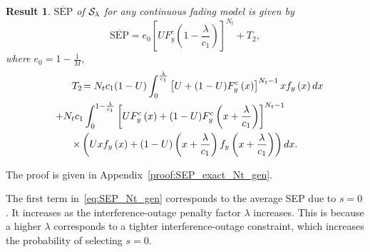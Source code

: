 \documentclass[12pt,draftcls,peerreview,onecolumn]{IEEEtran}
\newtheorem{result}{{\bf Result}}
\newcommand{\SEP}{\text{SEP}}
\newcommand{\nx}{{0}}
\newcommand{\lam}{\lambda}
\newcommand{\termtwo}{T_2}
\newcommand{\Nt}{{N_t}}
\newcommand{\Nr}{{N_r}}
\newcommand{\cone}{c_{1}}
\newcommand{\ctwo}{c_{2}}
\newcommand{\lambym}{\frac{\lam}{\cone}}
\newcommand{\al}{\ctwo}
\newcommand{\snr}{\Omega}
\newcommand{\albysnr}[1][]{\frac{\al#1}{\snr}}
\newcommand{\un}{U}
\newcommand{\zerosep}{e_0}
\newcommand{\callamrule}{{\cal S_{{\lam}}}}
\newcommand{\avgSEP}{\overline{\SEP}}
\newcommand{\unccdfy}[2]{\frac{{#1}\,\,\gamma\left(\Nr,-\albysnr\ln{#2}\right)}{\Gamma\left(\Nr\right)}}
\newcommand{\ytimespdfyNr}{\left(\ln\left(\frac{1}{x}\right)\right)^{\Nr-1}x^{\albysnr[]}} %
\newcommand{\ypluslamtimespdfyNr}{\left(\ln\left(\frac{1}{x+\lambym}\right)\right)^{\Nr-1}\left(x+\lambym\right)^{\albysnr[]}} %
\newcommand{\pdfyNrgen}[1]{f_{y}\left(#1\right)} %
\newcommand{\ccdfy}[1]{F^{c}_{y}\left(#1 \right)}
\newcommand{\unccdfygen}[2]{{#1} \ccdfy{#2}  }
\begin{document}
\begin{result}
\label{thm:SEP_exact_Nt_gen}
$\avgSEP$ of $\callamrule$ for any continuous fading model is given by
\begin{equation}
\label{eq:SEP_Nt_gen} 
\avgSEP= \zerosep\left[\unccdfygen{\un}{1-\lambym}\right]^{\Nt} + \termtwo,
\end{equation}
%
where $\zerosep=1-\frac{1}{M}$,
\begin{multline}
\hspace{25pt}\termtwo \!= \Nt\cone(1-\un)\int_{0}^{\lambym} \left[\un + \unccdfygen{(1-\un)}{x}\right]^{\Nt-1} x\pdfyNrgen{x} dx\\
\hspace{-30pt}+ \Nt\cone \int_{0}^{1-\lambym}
\left[\unccdfygen{\un}{x} +\unccdfygen{(1-\un)}{x+\lambym}  \right]^{\Nt-1}\\
\times\left(\un x\pdfyNrgen{x} + (1-\un)\left(x + \lambym\right) \pdfyNrgen{x + \lambym}\right) dx.
\label{eq:termtwo_gen}
\end{multline}
%
\end{result}
%
\begin{IEEEproof}
The proof is given in Appendix~\ref{proof:SEP_exact_Nt_gen}.
\end{IEEEproof}
%

The first term in~\eqref{eq:SEP_Nt_gen} corresponds to the average SEP due to $s=\nx$. It increases as the interference-outage penalty factor $\lam$ increases. This is because a higher $\lam$ corresponds to a tighter interference-outage constraint, which increases the probability of selecting $s=\nx$. 
%
\end{document}
